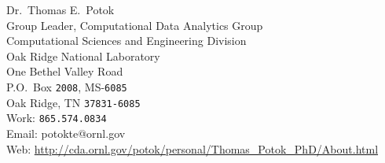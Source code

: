 \documentclass[11pt, a4paper]{article}
\begin{document}
Dr.\ Thomas E.\ Potok\\
Group Leader, Computational Data Analytics Group\\
Computational Sciences and Engineering Division\\
Oak Ridge National Laboratory\\
One Bethel Valley Road\\
P.O.\ Box \texttt{2008}, MS-\texttt{6085}\\
Oak Ridge, TN  \texttt{37831-6085}\\
Work: \texttt{865.574.0834}\\
Email: potokte@ornl.gov\\
Web: \href{http://cda.ornl.gov/potok/personal/Thomas\_Potok\_PhD/About.html}{http://cda.ornl.gov/potok/personal/Thomas\_Potok\_PhD/About.html}



\end{document}
